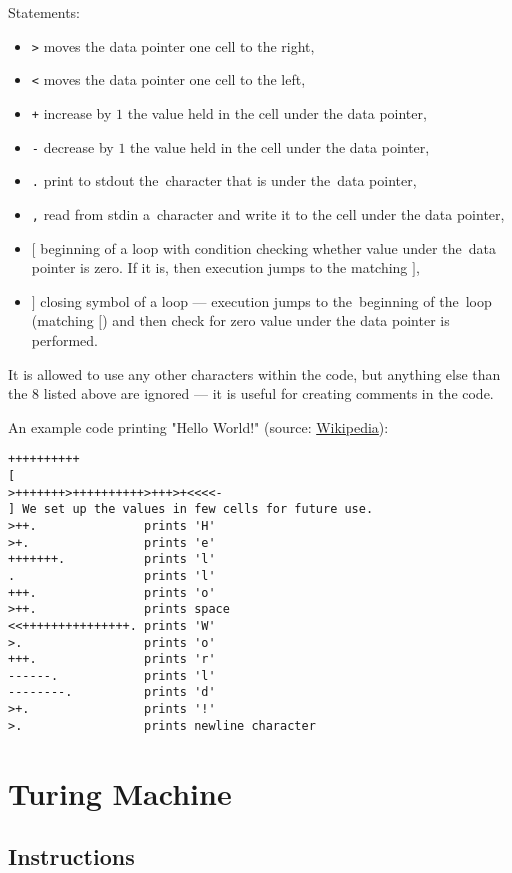 \documentclass[english,shortabstract,mgr]{iithesis}
\begin{document}
Statements:
\begin{itemize}
  \item \texttt{>} moves the data pointer one cell to the right,
  \item \texttt{<} moves the data pointer one cell to the left,
  \item \texttt{+} increase by $1$ the value held in the cell under the data pointer,
  \item \texttt{-} decrease by $1$ the value held in the cell under the data pointer,
  \item \texttt{.} print to stdout the~character that is under the~data pointer,
  \item \texttt{,} read from stdin a~character and write it to the cell under the data pointer,
  \item \texttt{$[$} beginning of a loop with condition checking whether value under
      the~data pointer is zero. If it is, then execution jumps to the matching $]$,
  \item \texttt{$]$} closing symbol of a loop --- execution jumps to the~beginning of the~loop
      (matching $[$) and then check for zero value under the data pointer is performed.
\end{itemize}

It is allowed to use any other characters within the code, but anything else than the $8$
listed above are ignored --- it is useful for creating comments in the code.

An example code printing "Hello World!" (source: \href{https://pl.wikipedia.org/wiki/Brainfuck#Przyk%C5%82ady}{Wikipedia}):
\begin{verbatim}
++++++++++
[
>+++++++>++++++++++>+++>+<<<<-
] We set up the values in few cells for future use.
>++.               prints 'H'
>+.                prints 'e'
+++++++.           prints 'l'
.                  prints 'l'
+++.               prints 'o'
>++.               prints space
<<+++++++++++++++. prints 'W'
>.                 prints 'o'
+++.               prints 'r'
------.            prints 'l'
--------.          prints 'd'
>+.                prints '!'
>.                 prints newline character
\end{verbatim}

\section {Turing Machine}

\subsection {Instructions}
\end{document}

